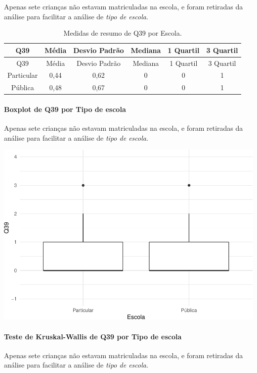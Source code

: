 \documentclass[]{article}
\let\oldparagraph\paragraph
\renewcommand{\paragraph}[1]{\oldparagraph{#1}\mbox{}}
\begin{document}
Apenas sete crianças não estavam matriculadas na escola, e foram retiradas da análise para facilitar a análise de \emph{tipo de escola}.

\begin{longtable}[]{@{}cccccc@{}}
\caption{\label{tab:unnamed-chunk-1531}Medidas de resumo de Q39 por Escola.}\tabularnewline
\toprule
Q39 & Média & Desvio Padrão & Mediana & 1 Quartil & 3 Quartil\tabularnewline
\midrule
\endfirsthead
\toprule
Q39 & Média & Desvio Padrão & Mediana & 1 Quartil & 3 Quartil\tabularnewline
\midrule
\endhead
Particular & 0,44 & 0,62 & 0 & 0 & 1\tabularnewline
Pública & 0,48 & 0,67 & 0 & 0 & 1\tabularnewline
\bottomrule
\end{longtable}

\hypertarget{boxplot-de-q39-por-tipo-de-escola}{%
\paragraph{Boxplot de Q39 por Tipo de escola}\label{boxplot-de-q39-por-tipo-de-escola}}

Apenas sete crianças não estavam matriculadas na escola, e foram retiradas da análise para facilitar a análise de \emph{tipo de escola}.

\begin{center}\includegraphics[width=0.75\linewidth]{relatorio_covid19_files/figure-latex/unnamed-chunk-1532-1} \end{center}

\hypertarget{teste-de-kruskal-wallis-de-q39-por-tipo-de-escola}{%
\paragraph{Teste de Kruskal-Wallis de Q39 por Tipo de escola}\label{teste-de-kruskal-wallis-de-q39-por-tipo-de-escola}}

Apenas sete crianças não estavam matriculadas na escola, e foram retiradas da análise para facilitar a análise de \emph{tipo de escola}.
\end{document}
